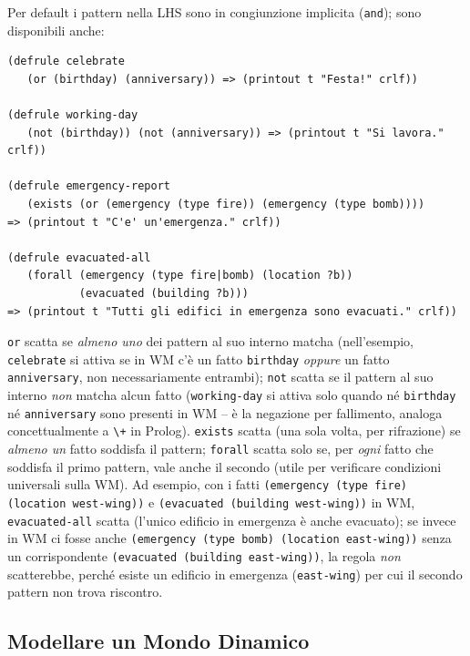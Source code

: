 \documentclass[a4paper,11pt]{article}
\begin{document}
Per default i pattern nella LHS sono in congiunzione implicita (\texttt{and}); sono disponibili anche:
\begin{lstlisting}
(defrule celebrate
   (or (birthday) (anniversary)) => (printout t "Festa!" crlf))

(defrule working-day
   (not (birthday)) (not (anniversary)) => (printout t "Si lavora." crlf))

(defrule emergency-report
   (exists (or (emergency (type fire)) (emergency (type bomb))))
=> (printout t "C'e' un'emergenza." crlf))

(defrule evacuated-all
   (forall (emergency (type fire|bomb) (location ?b))
           (evacuated (building ?b)))
=> (printout t "Tutti gli edifici in emergenza sono evacuati." crlf))
\end{lstlisting}
\texttt{or} scatta se \emph{almeno uno} dei pattern al suo interno matcha (nell'esempio, \texttt{celebrate} si attiva se in WM c'è un fatto \texttt{birthday} \emph{oppure} un fatto \texttt{anniversary}, non necessariamente entrambi); \texttt{not} scatta se il pattern al suo interno \emph{non} matcha alcun fatto (\texttt{working-day} si attiva solo quando né \texttt{birthday} né \texttt{anniversary} sono presenti in WM -- è la negazione per fallimento, analoga concettualmente a \texttt{\textbackslash+} in Prolog). \texttt{exists} scatta (una sola volta, per rifrazione) se \emph{almeno un} fatto soddisfa il pattern; \texttt{forall} scatta solo se, per \emph{ogni} fatto che soddisfa il primo pattern, vale anche il secondo (utile per verificare condizioni universali sulla WM). Ad esempio, con i fatti \texttt{(emergency (type fire) (location west-wing))} e \texttt{(evacuated (building west-wing))} in WM, \texttt{evacuated-all} scatta (l'unico edificio in emergenza è anche evacuato); se invece in WM ci fosse anche \texttt{(emergency (type bomb) (location east-wing))} senza un corrispondente \texttt{(evacuated (building east-wing))}, la regola \emph{non} scatterebbe, perché esiste un edificio in emergenza (\texttt{east-wing}) per cui il secondo pattern non trova riscontro.

\subsection{Modellare un Mondo Dinamico}
\end{document}
